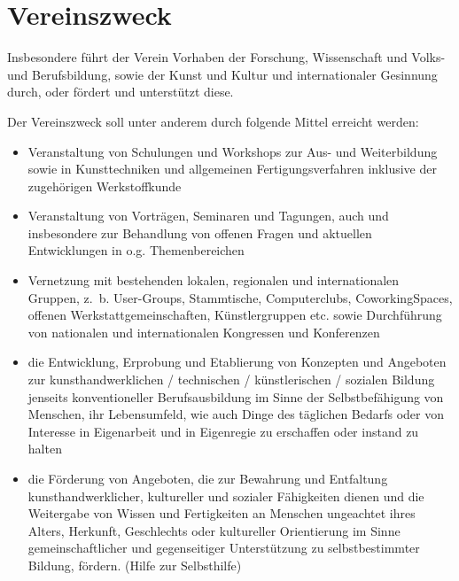 \documentclass[a5paper, ngerman, 10pt]{scrreprt}
\begin{document}
\section{Vereinszweck}
\begin{compactenum}[(1)]
    \item Insbesondere führt der Verein Vorhaben der Forschung, Wissenschaft
        und Volks- und Berufsbildung, sowie der Kunst und Kultur und
        internationaler Gesinnung durch, oder fördert und unterstützt diese.
    \item Der Vereinszweck soll unter anderem durch folgende Mittel erreicht
        werden:
        \begin{itemize}
            \item Veranstaltung von Schulungen und Workshops zur Aus- und
                Weiterbildung sowie in Kunsttechniken und allgemeinen
                Fertigungsverfahren inklusive der zugehörigen
                Werkstoffkunde
            \item Veranstaltung von Vorträgen, Seminaren und Tagungen, auch und
                insbesondere zur Behandlung von offenen Fragen und aktuellen
                Entwicklungen in o.g. Themenbereichen
            \item Vernetzung mit bestehenden lokalen, regionalen und
                internationalen Gruppen, z.~b.  User-Groups, Stammtische,
                Computerclubs, CoworkingSpaces, offenen
                Werkstattgemeinschaften, Künstlergruppen etc. sowie
                Durchführung von nationalen und internationalen Kongressen und
                Konferenzen
            \item die Entwicklung, Erprobung und Etablierung von Konzepten und
                Angeboten zur kunsthandwerklichen / technischen /
                künstlerischen / sozialen Bildung jenseits konventioneller
                Berufsausbildung im Sinne der Selbstbefähigung von Menschen,
                ihr Lebensumfeld, wie auch Dinge des täglichen Bedarfs oder von
                Interesse in Eigenarbeit und in Eigenregie zu erschaffen oder
                instand zu halten
            \item die Förderung von Angeboten, die zur Bewahrung und Entfaltung
                kunsthandwerklicher, kultureller und sozialer Fähigkeiten
                dienen und die Weitergabe von Wissen und Fertigkeiten an
                Menschen ungeachtet ihres Alters, Herkunft, Geschlechts oder
                kultureller Orientierung im Sinne gemeinschaftlicher und
                gegenseitiger Unterstützung zu selbstbestimmter Bildung,
                fördern. (Hilfe zur Selbsthilfe)
        \end{itemize}
\end{compactenum}
\end{document}
